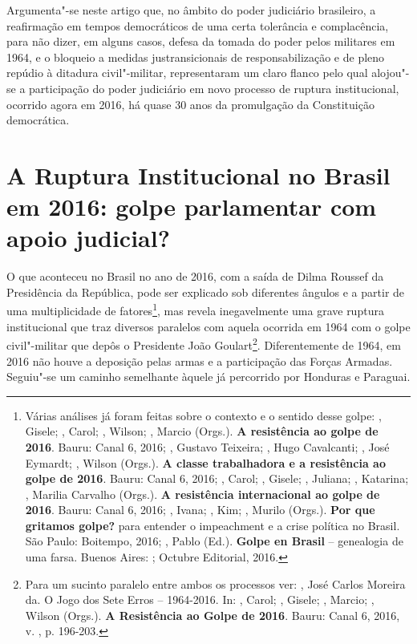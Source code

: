 Argumenta"-se neste artigo que, no âmbito do poder judiciário brasileiro,
a reafirmação em tempos democráticos de uma certa tolerância e
complacência, para não dizer, em alguns casos, defesa da tomada do poder
pelos militares em 1964, e o bloqueio a medidas justransicionais de
responsabilização e de pleno repúdio à ditadura civil"-militar,
representaram um claro flanco pelo qual alojou"-se a participação do
poder judiciário em novo processo de ruptura institucional, ocorrido
agora em 2016, há quase 30 anos da promulgação da Constituição
democrática.

\section{A Ruptura Institucional no Brasil em 2016: golpe parlamentar
com apoio judicial?}

O que aconteceu no Brasil no ano de 2016, com a saída de Dilma Roussef
da Presidência da República, pode ser explicado sob diferentes ângulos e
a partir de uma multiplicidade de fatores\footnote{Várias análises já
  foram feitas sobre o contexto e o sentido desse golpe: ,
  Gisele; , Carol;  , Wilson; , Marcio (Orgs.).
  \textbf{A resistência ao golpe de 2016}. Bauru: Canal 6, 2016; ,
  Gustavo Teixeira;  , Hugo Cavalcanti; , José
  Eymardt;  , Wilson (Orgs.). \textbf{A classe trabalhadora e
  a resistência ao golpe de 2016}. Bauru: Canal 6, 2016; , Carol;
  , Gisele; , Juliana; , Katarina;
  , Marilia Carvalho (Orgs.). \textbf{A resistência
  internacional ao golpe de 2016}. Bauru: Canal 6, 2016; ,
  Ivana; , Kim; , Murilo (Orgs.). \textbf{Por que gritamos
  golpe?} para entender o impeachment e a crise política no Brasil. São
  Paulo: Boitempo, 2016; , Pablo (Ed.). \textbf{Golpe en Brasil}
  -- genealogia de uma farsa. Buenos Aires: ; Octubre Editorial,
  2016.}, mas revela inegavelmente uma grave ruptura institucional que
traz diversos paralelos com aquela ocorrida em 1964 com o golpe
civil"-militar que depôs o Presidente João Goulart\footnote{Para um
  sucinto paralelo entre ambos os processos ver:  , José
  Carlos Moreira da. O Jogo dos Sete Erros -- 1964-2016. In: ,
  Carol; , Gisele; , Marcio;  , Wilson
  (Orgs.). \textbf{A Resistência ao Golpe de 2016}. Bauru: Canal 6,
  2016, v. , p. 196-203.}. Diferentemente de 1964, em 2016 não houve a
deposição pelas armas e a participação das Forças Armadas. Seguiu"-se um
caminho semelhante àquele já percorrido por Honduras e Paraguai.

